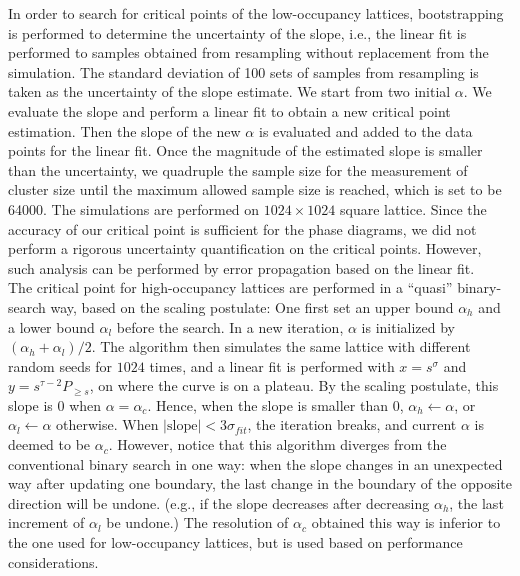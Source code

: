 \documentclass[11pt]{article}
\begin{document}
In order to search for critical points of the low-occupancy lattices, bootstrapping is performed to determine the uncertainty of the slope, i.e., the linear fit is performed to samples obtained from resampling without replacement from the simulation. The standard deviation of 100 sets of samples from resampling is taken as the uncertainty of the slope estimate. We start from two initial $\alpha$. We evaluate the slope and perform a linear fit to obtain a new critical point estimation. Then the slope of the new $\alpha$ is evaluated and added to the data points for the linear fit. Once the magnitude of the estimated slope is smaller than the uncertainty, we quadruple the sample size for the measurement of cluster size until the maximum allowed sample size is reached, which is set to be 64000. The simulations are performed on $1024 \times 1024$ square lattice. Since the accuracy of our critical point is sufficient for the phase diagrams, we did not perform a rigorous uncertainty quantification on the critical points. However, such analysis can be performed by error propagation based on the linear fit.\\



The critical point for high-occupancy lattices are performed in a ``quasi'' binary-search way, based on the scaling postulate: One first set an upper bound $\alpha_h$ and a lower bound $\alpha_l$ before the search. In a new iteration, $\alpha$ is initialized by $(\alpha_h+\alpha_l)/2$. The algorithm then simulates the same lattice with different random seeds for $1024$ times, and a linear fit is performed with $x=s^\sigma$ and $y=s^{\tau-2}P_{\geq s}$, on where the curve is on a plateau. By the scaling postulate, this slope is $0$ when $\alpha=\alpha_c$. Hence, when the slope is smaller than $0$, $\alpha_h\leftarrow\alpha$, or $\alpha_l\leftarrow\alpha$ otherwise. When $|\mathrm{slope}|<3\sigma_{fit}$, the iteration breaks, and current $\alpha$ is deemed to be $\alpha_c$. However, notice that this algorithm diverges from the conventional binary search in one way: when the slope changes in an unexpected way after updating one boundary, the last change in the boundary of the opposite direction will be undone. (e.g., if the slope decreases after decreasing $\alpha_h$, the last increment of $\alpha_l$ be undone.) The resolution of $\alpha_c$ obtained this way is inferior to the one used for low-occupancy lattices, but is used based on performance considerations.
\end{document}
